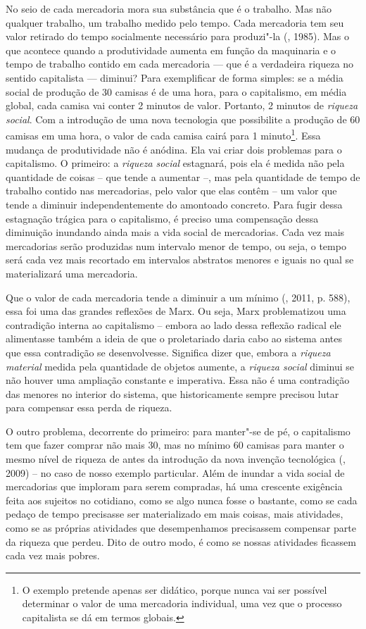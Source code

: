 {No seio de cada mercadoria mora sua substância que é o trabalho. Mas não
qualquer trabalho, um trabalho medido pelo tempo. Cada mercadoria tem
seu valor retirado do tempo socialmente necessário para produzi"-la
(, 1985). Mas o que acontece quando a produtividade aumenta em
função da maquinaria e o tempo de trabalho contido em cada mercadoria
--- que é a verdadeira riqueza no sentido capitalista --- diminui? Para
exemplificar de forma simples: se a média social de produção de 30
camisas é de uma hora, para o capitalismo, em média global, cada camisa
vai conter 2 minutos de valor. Portanto, 2 minutos de \emph{riqueza
social}. Com a introdução de uma nova tecnologia que possibilite a
produção de 60 camisas em uma hora, o valor de cada camisa cairá para 1
minuto\footnote{O exemplo pretende apenas ser didático, porque nunca vai
  ser possível determinar o valor de uma mercadoria individual, uma vez
  que o processo capitalista se dá em termos globais.}. Essa mudança de
produtividade não é anódina. Ela vai criar dois problemas para o
capitalismo. O primeiro: a \emph{riqueza social} estagnará, pois ela é
medida não pela quantidade de coisas -- que tende a aumentar --, mas
pela quantidade de tempo de trabalho contido nas mercadorias, pelo valor
que elas contêm -- um valor que tende a diminuir independentemente do
amontoado concreto. Para fugir dessa estagnação trágica para o
capitalismo, é preciso uma compensação dessa diminuição inundando ainda
mais a vida social de mercadorias. Cada vez mais mercadorias serão
produzidas num intervalo menor de tempo, ou seja, o tempo será cada vez
mais recortado em intervalos abstratos menores e iguais no qual se
materializará uma mercadoria.

Que o valor de cada mercadoria tende a diminuir a um mínimo (, 2011,
p. 588), essa foi uma das grandes reflexões de Marx. Ou seja, Marx
problematizou uma contradição interna ao capitalismo -- embora ao lado
dessa reflexão radical ele alimentasse também a ideia de que o
proletariado daria cabo ao sistema antes que essa contradição se
desenvolvesse. Significa dizer que, embora a \emph{riqueza material}
medida pela quantidade de objetos aumente, a \emph{riqueza social}
diminui se não houver uma ampliação constante e imperativa. Essa não é
uma contradição das menores no interior do sistema, que historicamente
sempre precisou lutar para compensar essa perda de riqueza.

O outro problema, decorrente do primeiro: para manter"-se de pé, o
capitalismo tem que fazer comprar não mais 30, mas no mínimo 60 camisas
para manter o mesmo nível de riqueza de antes da introdução da nova
invenção tecnológica (, 2009) -- no caso de nosso exemplo
particular. Além de inundar a vida social de mercadorias que imploram
para serem compradas, há uma crescente exigência feita aos sujeitos no
cotidiano, como se algo nunca fosse o bastante, como se cada pedaço de
tempo precisasse ser materializado em mais coisas, mais atividades, como
se as próprias atividades que desempenhamos precisassem compensar parte
da riqueza que perdeu. Dito de outro modo, é como se nossas atividades
ficassem cada vez mais pobres.

}
